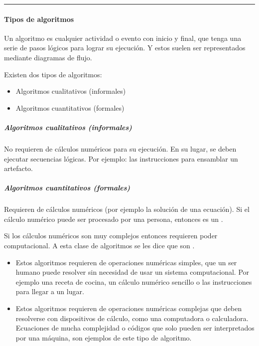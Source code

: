 \documentclass[letterpaper,10pt,spanish]{sphinxmanual}
\begin{document}
\bigskip\hrule\bigskip



\paragraph{Tipos de algoritmos}
\label{\detokenize{cursos/ofimatica11/recursos/T03:tipos-de-algoritmos}}
\sphinxAtStartPar
Un algoritmo es cualquier actividad o evento con inicio y final, que tenga una serie de pasos lógicos para lograr su ejecución. Y estos suelen ser representados mediante diagramas de flujo.

\sphinxAtStartPar
Existen dos tipos de algoritmos:
\begin{itemize}
\item {} 
\sphinxAtStartPar
Algoritmos cualitativos (informales)

\item {} 
\sphinxAtStartPar
Algoritmos cuantitativos (formales)

\end{itemize}


\subparagraph{Algoritmos cualitativos (informales)}
\label{\detokenize{cursos/ofimatica11/recursos/T03:algoritmos-cualitativos-informales}}
\sphinxAtStartPar
No requieren de cálculos numéricos para su ejecución. En su lugar, se deben ejecutar secuencias lógicas. Por ejemplo: las instrucciones para ensamblar un artefacto.


\subparagraph{Algoritmos cuantitativos (formales)}
\label{\detokenize{cursos/ofimatica11/recursos/T03:algoritmos-cuantitativos-formales}}
\sphinxAtStartPar
Requieren de cálculos numéricos (por ejemplo la solución de una ecuación). Si el cálculo numérico puede ser procesado por una persona, entonces es un .

\sphinxAtStartPar
Si los cálculos numéricos son muy complejos entonces requieren poder computacional. A esta clase de algoritmos se les dice que son .
\begin{itemize}
\item {} 
\sphinxAtStartPar
{} Estos algoritmos requieren de operaciones numéricas simples, que un ser humano puede resolver sin necesidad de usar un sistema computacional. Por ejemplo una receta de cocina, un cálculo numérico sencillo o las instrucciones para llegar a un lugar.

\item {} 
\sphinxAtStartPar
{} Estos algoritmos requieren de operaciones numéricas complejas que deben resolverse con dispositivos de cálculo, como una computadora o calculadora. Ecuaciones de mucha complejidad o códigos que solo pueden ser interpretados por una máquina, son ejemplos de este tipo de algoritmo.

\end{itemize}
\end{document}
